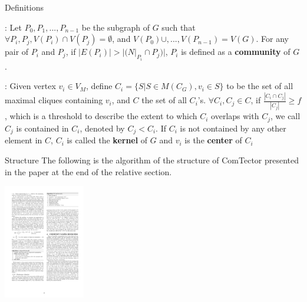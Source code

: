 \begin{frame}{Definitions}

\begin{description}
\vskip 0.7cm	
	\item[\emph{Definition 4}]: Let $P_0,P_1,...,P_{n-1}$ be the subgraph of $G$ such that $\forall P_i,P_j, V(P_i) \cap V(P_j) = \emptyset$, and $V(P_0) \cup , ... , V(P_{n-1}) = V(G)$. For any pair of $P_i$ and $P_j$, if $|E(P_i)| > |(N|_{P_i} \cap P_j)|$, $P_i$ is defined as a \textbf{community} of $G$.
\vskip 0.5cm	
	\item[\emph{Definition 5}]: Given vertex $v_i \in V_M$, define $C_i = \{S|S \in M(C_G), v_i \in S \}$ to be the set of all maximal cliques containing $v_i$, and $C$ the set of all $C_i$'s. $\forall C_i, C_j \in C$, if $ \frac{| C_i \cap C_j |}{|C_j|} \geq f$, which is a threshold to describe the extent to which $C_i$ overlaps with $C_j$, we call $C_j$ is contained in $C_i$, denoted by $C_j < C_i$. If $C_i$ is not contained by any other element in $C$, $C_i$ is called the \textbf{kernel} of $G$ and $v_i$ is the \textbf{center} of $C_i$
\end{description}

\end{frame}




\begin{frame}{Structure}
\vskip 0.7cm
The following is the algorithm of the structure of ComTector presented in the paper at the end of the relative section.
\begin{center}
	\includegraphics[height=5cm]{images/comTectorStructure.pdf}
\end{center}

\end{frame}

